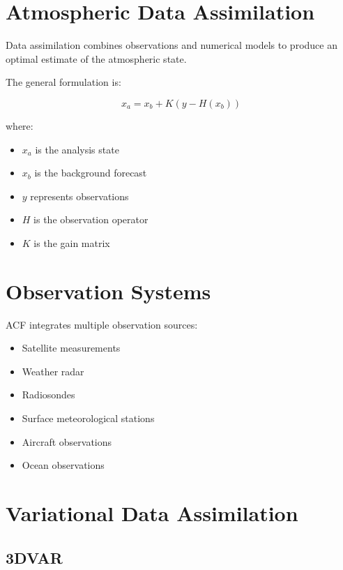 \section{Atmospheric Data Assimilation}

Data assimilation combines observations and numerical models
to produce an optimal estimate of the atmospheric state.

The general formulation is:

\begin{equation}
x_a = x_b + K(y-H(x_b))
\end{equation}

where:

\begin{itemize}
\item $x_a$ is the analysis state
\item $x_b$ is the background forecast
\item $y$ represents observations
\item $H$ is the observation operator
\item $K$ is the gain matrix
\end{itemize}



\section{Observation Systems}

ACF integrates multiple observation sources:

\begin{itemize}
\item Satellite measurements
\item Weather radar
\item Radiosondes
\item Surface meteorological stations
\item Aircraft observations
\item Ocean observations
\end{itemize}



\section{Variational Data Assimilation}


\subsection{3DVAR}

